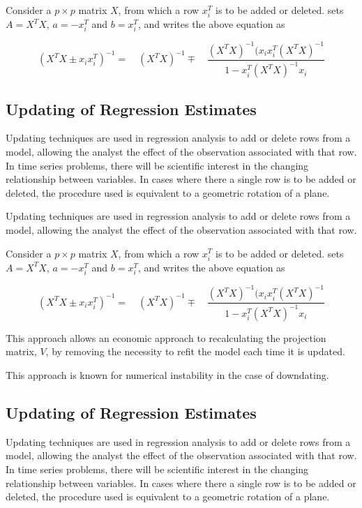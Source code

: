 \documentclass[MAIN.tex]{subfiles}
\begin{document}
Consider a $p \times p$ matrix $X$, from which a row $x_{i}^{T}$
is to be added or deleted. \citet{CookWeisberg} sets $A = X^{T}X$,
$a=-x_{i}^{T}$ and $b=x_{i}^{T}$, and writes the above equation as

\begin{equation}
(X^{T}X \pm x_{i}x_{i}^{T})^{-1} = \quad(X^{T}X )^{-1} \mp \quad
\frac{(X^{T}X)^{-1}(x_{i}x_{i}^{T}(X^{T}X)^{-1}}{1-x_{i}^{T}(X^{T}X)^{-1}x_{i}}
\end{equation}





	\subsection{Updating of Regression Estimates}
	Updating techniques are used in regression analysis to add or delete rows from a model, allowing the analyst the effect of the observation associated with that row. In time series problems, there will be scientific interest in the changing relationship between variables. In cases where there a single row is to be added or deleted, the procedure used is equivalent to a geometric rotation of a plane.
	
	Updating techniques are used in regression analysis to add or delete rows from a model, allowing the analyst the effect of the observation associated with that row.
	
	Consider a $p \times p$ matrix $X$, from which a row $x_{i}^{T}$ is to be added or deleted. \citet{CookWeisberg} sets $A = X^{T}X$,
	$a=-x_{i}^{T}$ and $b=x_{i}^{T}$, and writes the above equation as
	
	\begin{equation}
	(X^{T}X \pm x_{i}x_{i}^{T})^{-1} = \quad(X^{T}X )^{-1} \mp \quad
	\frac{(X^{T}X)^{-1}(x_{i}x_{i}^{T}(X^{T}X)^{-1}}{1-x_{i}^{T}(X^{T}X)^{-1}x_{i}}
	\end{equation}
	
	This approach allows an economic approach to recalculating the
	projection matrix, $V$, by removing the necessity to refit the
	model each time it is updated.
	
	This approach is known for numerical instability in the case of
	downdating.
\subsection{Updating of Regression Estimates}
Updating techniques are used in regression analysis to add or delete rows from a model, allowing the analyst the effect of the observation associated with that row. In time series problems, there will be scientific interest in the changing relationship between variables. In cases where there a single row is to be added or deleted, the procedure used is equivalent to a geometric rotation of a plane.
\end{document}
